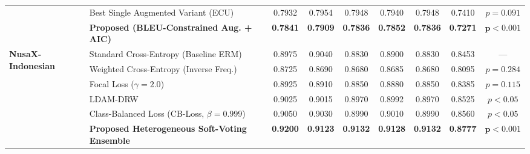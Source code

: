 \begin{tabularx}{\textwidth}{l >{\raggedright\arraybackslash}X c c c c c c c}
& Best Single Augmented Variant (ECU) & 0.7932 & 0.7954 & 0.7948 & 0.7940 & 0.7948 & 0.7410 & $p = 0.091$ \\
& \textbf{Proposed (BLEU-Constrained Aug. + AIC)} & \textbf{0.7841} & \textbf{0.7909} & \textbf{0.7836} & \textbf{0.7852} & \textbf{0.7836} & \textbf{0.7271} & $\mathbf{p < 0.001}$ \\
\midrule
\multirow{6}{*}{\textbf{NusaX-Indonesian}}
& Standard Cross-Entropy (Baseline ERM) & 0.8975 & 0.9040 & 0.8830 & 0.8900 & 0.8830 & 0.8453 & --- \\
& Weighted Cross-Entropy (Inverse Freq.) & 0.8725 & 0.8690 & 0.8680 & 0.8685 & 0.8680 & 0.8095 & $p = 0.284$ \\
& Focal Loss ($\gamma = 2.0$) & 0.8925 & 0.8910 & 0.8850 & 0.8880 & 0.8850 & 0.8385 & $p = 0.115$ \\
& LDAM-DRW & 0.9025 & 0.9015 & 0.8970 & 0.8992 & 0.8970 & 0.8525 & $p < 0.05$ \\
& Class-Balanced Loss (CB-Loss, $\beta = 0.999$) & 0.9050 & 0.9030 & 0.8990 & 0.9010 & 0.8990 & 0.8560 & $p < 0.05$ \\
& \textbf{Proposed Heterogeneous Soft-Voting Ensemble} & \textbf{0.9200} & \textbf{0.9123} & \textbf{0.9132} & \textbf{0.9128} & \textbf{0.9132} & \textbf{0.8777} & $\mathbf{p < 0.001}$ \\
\bottomrule
\end{tabularx}